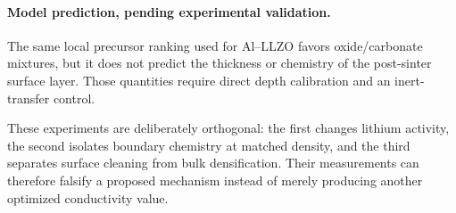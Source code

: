 \paragraph{Model prediction, pending experimental validation.}
The same local precursor ranking used for Al--LLZO favors oxide/carbonate mixtures, but it does not predict the thickness or chemistry of the post-sinter surface layer. Those quantities require direct depth calibration and an inert-transfer control.

These experiments are deliberately orthogonal: the first changes lithium activity, the second isolates boundary chemistry at matched density, and the third separates surface cleaning from bulk densification. Their measurements can therefore falsify a proposed mechanism instead of merely producing another optimized conductivity value.
